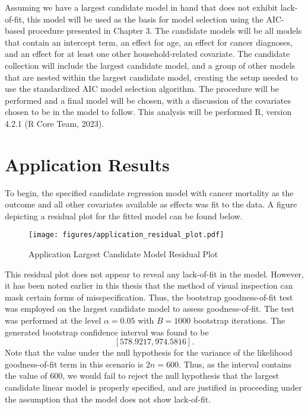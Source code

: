 		Assuming we have a largest candidate model in hand that does not exhibit lack-of-fit, this model will be used as the basis for model selection using the
		AIC-based procedure presented in Chapter 3. The candidate models will be all models that contain an intercept term, an effect for age, an effect for cancer
		diagnoses, and an effect for at least one other household-related covariate. The candidate collection will include the largest candidate model, and a group of other models that
		are nested within the largest candidate model, creating the setup needed to use the standardized AIC model selection algorithm. The procedure will be performed and a final model
		will be chosen, with a discussion of the covariates chosen to be in the model to follow. This analysis will be performed R, version 4.2.1 (R Core Team, 2023).
		
		\section{Application Results} \label{sec:app_res}

		To begin, the specified candidate regression model with cancer mortality as the outcome and all other covariates available as effects was fit to the data. A
		figure depicting a residual plot for the fitted model can be found below.

		\begin{figure}[H]
			\centering
			\captionsetup{justification=centering}
			\texttt{[image: figures/application\_residual\_plot.pdf]}
			\caption{\label{fig:app_residual_plot} Application Largest Candidate Model Residual Plot}
		\end{figure}

		This residual plot does not appear to reveal any lack-of-fit in the model. However, it has been noted earlier in this thesis that the method of visual
		inspection can mask certain forms of misspecification. Thus, the bootstrap goodness-of-fit test was employed on the largest candidate model to assess
		goodness-of-fit. The test was performed at the level $\alpha = 0.05$ with $B = 1000$ bootstrap iterations. The generated bootstrap confidence interval
		was found to be
		\begin{equation*}
			\left[ 578.9217, 974.5816 \right].
		\end{equation*}
		Note that the value under the null hypothesis for the variance of the likelihood goodness-of-fit term in this scenario is $2n = 600$. Thus, as the interval contains the
		value of $600$, we would fail to reject the null hypothesis that the largest candidate linear model is properly specified, and are justified in proceeding
		under the assumption that the model does not show lack-of-fit.

